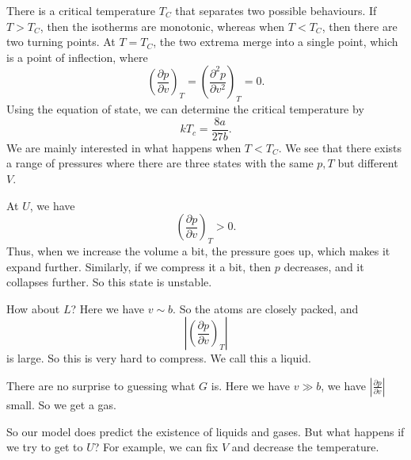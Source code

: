 \documentclass[a4paper]{article}
\begin{document}
There is a critical temperature $T_C$ that separates two possible behaviours. If $T > T_C$, then the isotherms are monotonic, whereas when $T < T_C$, then there are two turning points. At $T = T_C$, the two extrema merge into a single point, which is a point of inflection, where
\[
  \left(\frac{\partial p}{\partial v}\right)_T = \left(\frac{\partial^2 p}{\partial v^2}\right)_T = 0.
\]
Using the equation of state, we can determine the critical temperature by
\[
  kT_c = \frac{8a}{27 b}.
\]
We are mainly interested in what happens when $T < T_C$. We see that there exists a range of pressures where there are three states with the same $p, T$ but different $V$.
\begin{center}
\end{center}
At $U$, we have
\[
  \left(\frac{\partial p}{\partial v}\right)_T > 0.
\]
Thus, when we increase the volume a bit, the pressure goes up, which makes it expand further. Similarly, if we compress it a bit, then $p$ decreases, and it collapses further. So this state is unstable.

How about $L$? Here we have $v \sim b$. So the atoms are closely packed, and
\[
  \left|\left(\frac{\partial p}{\partial v}\right)_T\right|
\]
is large. So this is very hard to compress. We call this a liquid.

There are no surprise to guessing what $G$ is. Here we have $v \gg b$, we have $\left|\frac{\partial p}{\partial v}\right|$ small. So we get a gas.

So our model does predict the existence of liquids and gases. But what happens if we try to get to $U$? For example, we can fix $V$ and decrease the temperature.
\end{document}
